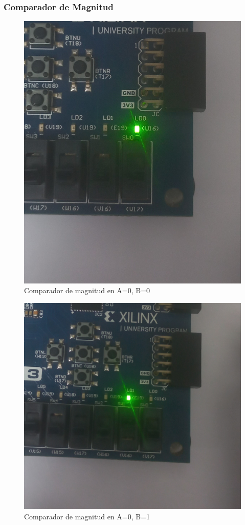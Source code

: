 \documentclass[12pt]{article}  %
\begin{document}
\subsubsection*{Comparador de Magnitud}

\begin{figure}[!ht]
    \centering
    \caption{Comparador de magnitud en A=0, B=0}
    \includegraphics[width=0.4\linewidth]{simulations/magnitud-comp/comp-mag-00.jpg}
\end{figure}
\begin{figure}[!ht]
    \centering
    \caption{Comparador de magnitud en A=0, B=1}
    \includegraphics[width=0.5\linewidth]{simulations/magnitud-comp/comp-mag-01.jpg}
\end{figure}
\newpage
\end{document}
